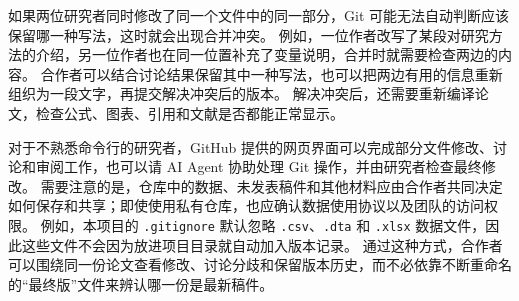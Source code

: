 如果两位研究者同时修改了同一个文件中的同一部分，Git 可能无法自动判断应该保留哪一种写法，这时就会出现合并冲突。
例如，一位作者改写了某段对研究方法的介绍，另一位作者也在同一位置补充了变量说明，合并时就需要检查两边的内容。
合作者可以结合讨论结果保留其中一种写法，也可以把两边有用的信息重新组织为一段文字，再提交解决冲突后的版本。
解决冲突后，还需要重新编译论文，检查公式、图表、引用和文献是否都能正常显示。

对于不熟悉命令行的研究者，GitHub 提供的网页界面可以完成部分文件修改、讨论和审阅工作，也可以请 AI Agent 协助处理 Git 操作，并由研究者检查最终修改。
需要注意的是，仓库中的数据、未发表稿件和其他材料应由合作者共同决定如何保存和共享；即使使用私有仓库，也应确认数据使用协议以及团队的访问权限。
例如，本项目的 \texttt{.gitignore} 默认忽略 \texttt{.csv}、\texttt{.dta} 和 \texttt{.xlsx} 数据文件，因此这些文件不会因为放进项目目录就自动加入版本记录。
通过这种方式，合作者可以围绕同一份论文查看修改、讨论分歧和保留版本历史，而不必依靠不断重命名的“最终版”文件来辨认哪一份是最新稿件。
